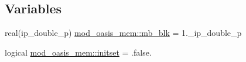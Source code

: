 \subsection*{Variables}
\begin{DoxyCompactItemize}
\item 
real(ip\+\_\+double\+\_\+p) \hyperlink{namespacemod__oasis__mem_a7c262f1c120ed57d527ee3de91552ee9}{mod\+\_\+oasis\+\_\+mem\+::mb\+\_\+blk} = 1.\+\_\+ip\+\_\+double\+\_\+p
\item 
logical \hyperlink{namespacemod__oasis__mem_aad83c95e1a17a31825eb9c4e1c663aa1}{mod\+\_\+oasis\+\_\+mem\+::initset} = .false.
\end{DoxyCompactItemize}
